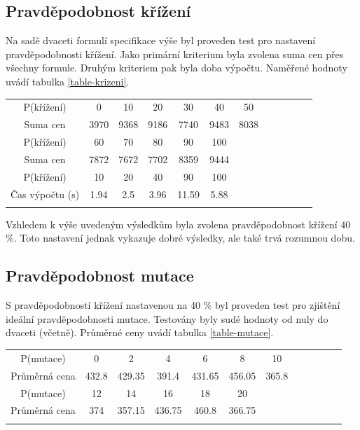 \documentclass[a4paper]{article}
\begin{document}
	\subsection{Pravděpodobnost křížení}
		Na sadě dvaceti formulí specifikace výše byl proveden test pro nastavení pravděpodobnosti křížení. Jako primární kriterium byla zvolena suma cen přes všechny formule.  Druhým kriteriem pak byla doba výpočtu. Naměřené hodnoty uvádí tabulka \ref{table-krizeni}.
		
		\begin{tabular}{cccccccccccc} \label{table-krizeni}
		\\
		P(křížení) & 0 & 10 & 20 & 30 & 40 & 50 \\
		Suma cen & 3970	 & 9368 & 9186 & 7740 & 9483 & 8038 \\
		\hline
		P(křížení) & 60 & 70 & 80 & 90 & 100 \\
		Suma cen & 7872 & 7672 & 7702 & 8359 & 9444 \\
		\hline
		P(křížení) & 10 & 20 & 40 & 90 & 100\\
		Čas výpočtu (s) & 1.94 & 2.5 & 3.96 & 11.59 & 5.88\\
		\\
		\end{tabular}
		
		Vzhledem k výše uvedeným výsledkům byla zvolena pravděpodobnost křížení 40 \%. Toto nastavení jednak vykazuje dobré výsledky, ale také trvá rozumnou dobu.
	
	\subsection{Pravděpodobnost mutace}
		S pravděpodobností křížení nastavenou na 40 \% byl proveden test pro zjištění ideální pravděpodobnosti mutace. Testovány byly sudé hodnoty od nuly do dvaceti (včetně). Průměrné ceny uvádí tabulka \ref{table-mutace}.
		
		\begin{tabular}{cccccccccccc} \label{table-mutace}
		\\
		P(mutace) & 0 & 2 & 4 & 6 & 8 & 10 \\
		Průměrná cena & 432.8 & 429.35 & 391.4 & 431.65 & 456.05 & 365.8\\
		\hline
		P(mutace) & 12 & 14 & 16 & 18 & 20 \\
		Průměrná cena & 374 & 357.15 & 436.75	 & 460.8 & 366.75 \\
		\\
		\end{tabular}
		
\end{document}
